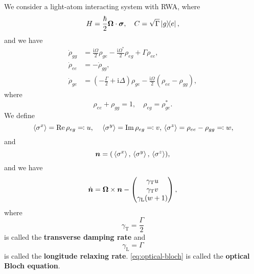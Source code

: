 \documentclass[hyperref, a4paper]{article}
\newcommand*{\ii}{\mathrm{i}}
\newcommand*{\concept}[1]{{\textbf{#1}}}
\begin{document}
We consider a light-atom interacting system with RWA, where 
\begin{equation}
    H = \frac{\hbar}{2} \vb*{\Omega} \cdot \vb*{\sigma}, \quad C = \sqrt{\Gamma} \dyad{g}{e},
\end{equation} 
and we have 
\begin{equation}
    \begin{aligned}
        \dot{\rho}_{gg} &= \frac{\ii \Omega}{2} \rho_{ge} - \frac{\ii \Omega^*}{2} \rho_{eg} + \Gamma \rho_{ee}, \\
        \dot{\rho}_{ee} &= - \dot{\rho}_{gg}, \\
        \dot{\rho}_{ge} &= \left( - \frac{\Gamma}{2} + \ii \Delta \right) \rho_{ge} - \frac{\ii \Omega}{2} (\rho_{ee} - \rho_{gg}),
    \end{aligned}
\end{equation}
where 
\begin{equation}
    \rho_{ee} + \rho_{gg} = 1, \quad \rho_{eg} = \rho_{ge}^*.
\end{equation}
We define 
\begin{equation}
    \expval*{\sigma^x} = \Re \rho_{eg} \eqqcolon u, \quad \expval*{\sigma^y} = \Im \rho_{eg} \eqqcolon v,
    \expval*{\sigma^z} = \rho_{ee} - \rho_{gg} \eqqcolon w,
\end{equation}
and 
\begin{equation}
    \vb*{n} = (\expval*{\sigma^x}, \expval*{\sigma^y}, \expval*{\sigma^z}),
\end{equation}
and we have 
\begin{equation}
    \dot{\vb*{n}} = \vb*{\Omega} \times \vb*{n} - \pmqty{ \gamma_\text{T} u \\ \gamma_\text{T} v \\ \gamma_\text{L} (w+1) },
    \label{eq:optical-bloch}
\end{equation}
where 
\begin{equation}
    \gamma_\text{T} = \frac{\Gamma}{2}
\end{equation}
is called the \concept{transverse damping rate} and 
\begin{equation}
    \gamma_\text{L} = \Gamma
\end{equation}
is called the \concept{longitude relaxing rate}. \eqref{eq:optical-bloch} is called the 
\concept{optical Bloch equation}.
\end{document}
